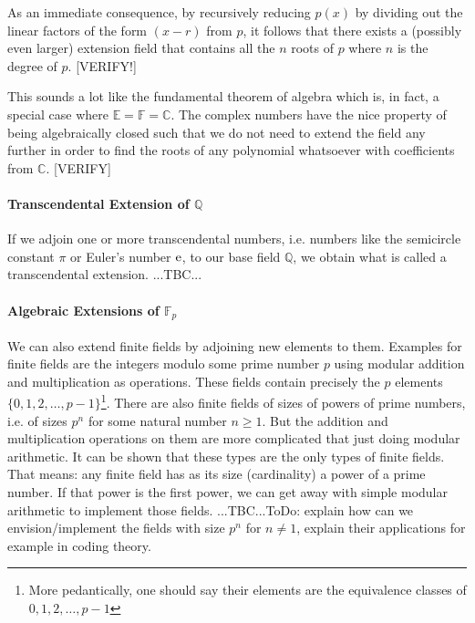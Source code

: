 \medskip
As an immediate consequence, by recursively reducing $p(x)$ by dividing out the linear factors of the form $(x-r)$ from $p$, it follows that there exists a (possibly even larger) extension field that contains all the $n$ roots of $p$ where $n$ is the degree of $p$. [VERIFY!]

\medskip
This sounds a lot like the fundamental theorem of algebra which is, in fact, a special case where  $\mathbb{E} = \mathbb{F} = \mathbb{C}$. The complex numbers have the nice property of being algebraically closed such that we do not need to extend the field any further in order to find the roots of any polynomial whatsoever with coefficients from $\mathbb{C}$. [VERIFY]


\paragraph{Transcendental Extension of $\mathbb{Q}$}
If we adjoin one or more transcendental numbers, i.e. numbers like the semicircle constant $\pi$ or Euler's number $\operatorname{\mathrm{e}}$, to our base field $\mathbb{Q}$, we obtain what is called a transcendental extension. ...TBC...








\paragraph{Algebraic Extensions of $\mathbb{F}_p$} We can also extend finite fields by adjoining new elements to them. Examples for finite fields are the integers modulo some prime number $p$ using modular addition and multiplication as operations. These fields contain precisely the $p$ elements $\{0,1,2,\ldots,p-1\}$\footnote{More pedantically, one should say their elements are the equivalence classes of $0,1,2,\ldots,p-1$}. There are also finite fields of sizes of powers of prime numbers, i.e. of sizes $p^n$ for some natural number $n \geq 1$. But the addition and multiplication operations on them are more complicated that just doing modular arithmetic. It can be shown that these types are the only types of finite fields. That means: any finite field has as its size (cardinality) a power of a prime number. If that power is the first power, we can get away with simple modular arithmetic to implement those fields. ...TBC...ToDo: explain how can we envision/implement the fields with size $p^n$ for $n \neq 1$, explain their applications for example in coding theory.

